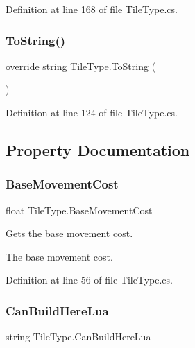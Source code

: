 Definition at line 168 of file Tile\+Type.\+cs.

\mbox{\label{class_tile_type_ab6b89688d93a7e3b1cb18be3bbbf0b82}} 
\subsubsection{\texorpdfstring{To\+String()}{ToString()}}
{\footnotesize\ttfamily override string Tile\+Type.\+To\+String (\begin{DoxyParamCaption}{ }\end{DoxyParamCaption})}



Definition at line 124 of file Tile\+Type.\+cs.



\subsection{Property Documentation}
\mbox{\label{class_tile_type_a7d008dccbb7ecaf0f12acae8f7989068}} 
\subsubsection{\texorpdfstring{Base\+Movement\+Cost}{BaseMovementCost}}
{\footnotesize\ttfamily float Tile\+Type.\+Base\+Movement\+Cost\hspace{0.3cm}{\ttfamily [get]}}



Gets the base movement cost. 

The base movement cost.

Definition at line 56 of file Tile\+Type.\+cs.

\mbox{\label{class_tile_type_a4a0ffcd58093d3a5c9b085f9a69707f7}} 
\subsubsection{\texorpdfstring{Can\+Build\+Here\+Lua}{CanBuildHereLua}}
{\footnotesize\ttfamily string Tile\+Type.\+Can\+Build\+Here\+Lua\hspace{0.3cm}{\ttfamily [get]}}




